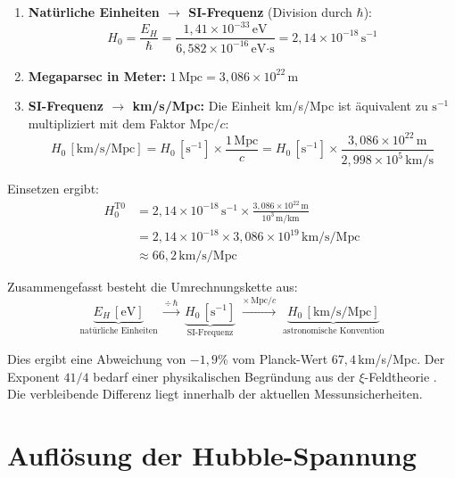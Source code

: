 	\begin{enumerate}
		\item \textbf{Natürliche Einheiten $\rightarrow$ SI-Frequenz} (Division durch $\hbar$):
		\begin{equation*}
			H_0 = \frac{E_H}{\hbar} = \frac{1{,}41 \times 10^{-33}\,\text{eV}}{6{,}582 \times 10^{-16}\,\text{eV·s}} = 2{,}14 \times 10^{-18}\,\text{s}^{-1}
		\end{equation*}
		\item \textbf{Megaparsec in Meter:} $1\,\text{Mpc} = 3{,}086 \times 10^{22}\,\text{m}$
		\item \textbf{SI-Frequenz $\rightarrow$ km/s/Mpc:} Die Einheit km/s/Mpc ist äquivalent zu $\text{s}^{-1}$ multipliziert mit dem Faktor $\text{Mpc}/c$:
		\begin{equation*}
			H_0\,[\text{km/s/Mpc}] = H_0\,[\text{s}^{-1}] \times \frac{1\,\text{Mpc}}{c} = H_0\,[\text{s}^{-1}] \times \frac{3{,}086 \times 10^{22}\,\text{m}}{2{,}998 \times 10^{5}\,\text{km/s}}
		\end{equation*}
	\end{enumerate}
	
	Einsetzen ergibt:
	\begin{align*}
		H_0^{\text{T0}} &= 2{,}14 \times 10^{-18}\,\text{s}^{-1} \times \frac{3{,}086 \times 10^{22}\,\text{m}}{10^3\,\text{m/km}} \\
		&= 2{,}14 \times 10^{-18} \times 3{,}086 \times 10^{19}\,\text{km/s/Mpc} \\
		&\approx 66{,}2\,\text{km/s/Mpc}
	\end{align*}
	
	Zusammengefasst besteht die Umrechnungskette aus:
	\begin{equation}
		\underbrace{E_H\,[\text{eV}]}_{\text{natürliche Einheiten}} \;\xrightarrow{\div\,\hbar}\; \underbrace{H_0\,[\text{s}^{-1}]}_{\text{SI-Frequenz}} \;\xrightarrow{\times\,\text{Mpc}/c}\; \underbrace{H_0\,[\text{km/s/Mpc}]}_{\text{astronomische Konvention}}
	\end{equation}
	
	Dies ergibt eine Abweichung von $-1{,}9\%$ vom Planck-Wert $67{,}4\,$km/s/Mpc. Der Exponent $41/4$ bedarf einer physikalischen Begründung aus der $\xi$-Feldtheorie \cite{riess2019}. Die verbleibende Differenz liegt innerhalb der aktuellen Messunsicherheiten.
	
	\section{Auflösung der Hubble-Spannung}
	
